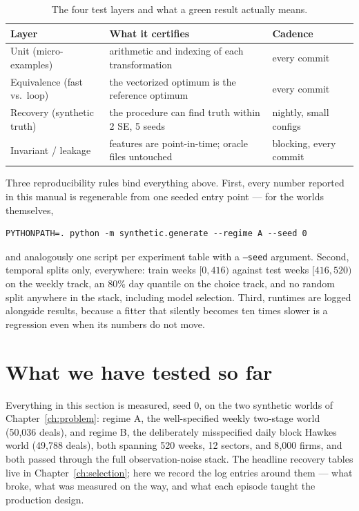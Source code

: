 \begin{table}[htbp]
\centering
\small
\begin{tabular}{lp{5.6cm}l}
\toprule
Layer & What it certifies & Cadence \\
\midrule
Unit (micro-examples) & arithmetic and indexing of each transformation & every commit \\
Equivalence (fast vs.\ loop) & the vectorized optimum is the reference optimum & every commit \\
Recovery (synthetic truth) & the procedure can find truth within 2 SE, 5 seeds & nightly, small configs \\
Invariant / leakage & features are point-in-time; oracle files untouched & blocking, every commit \\
\bottomrule
\end{tabular}
\caption{The four test layers and what a green result actually means.}
\label{tab:cp-layers}
\end{table}

Three reproducibility rules bind everything above. First, every number reported in this manual is
regenerable from one seeded entry point --- for the worlds themselves,
\begin{verbatim}
PYTHONPATH=. python -m synthetic.generate --regime A --seed 0
\end{verbatim}
and analogously one script per experiment table with a \texttt{--seed} argument. Second, temporal splits
only, everywhere: train weeks $[0,416)$ against test weeks $[416,520)$ on the weekly track, an 80\% day
quantile on the choice track, and no random split anywhere in the stack, including model selection. Third,
runtimes are logged alongside results, because a fitter that silently becomes ten times slower is a
regression even when its numbers do not move.

\section{What we have tested so far}
\label{sec:cp-log}

Everything in this section is measured, seed 0, on the two synthetic worlds of Chapter~\ref{ch:problem}:
regime A, the well-specified weekly two-stage world (50{,}036 deals), and regime B, the deliberately
misspecified daily block Hawkes world (49{,}788 deals), both spanning 520 weeks, 12 sectors, and 8{,}000
firms, and both passed through the full observation-noise stack. The headline recovery tables live in
Chapter~\ref{ch:selection}; here we record the log entries around them --- what broke, what was measured on
the way, and what each episode taught the production design.

